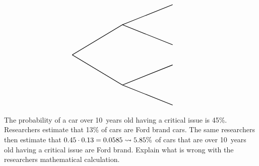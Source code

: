 \documentclass[12pt,letterpaper]{exam}
\begin{document}
\begin{questions}
\[\begin{tikzpicture}[scale= 1.0]
		\node at (1,1) {\FirstUpLabel};	
		\node at (1,-1) {\FirstDownLabel};	
		\node at (1.8,0.6) {\Up};
		\node at (1.8,-0.6) {\Down};
		\draw[thick] (0,0) -- (2.5,1.5);
		\draw[thick] (0,0) -- (2.5,-1.5);
		
		\node at (3.75,2.3) {\SecondUpLabel};
		\node at (3.75,0.7) {\SecondDownLabel};
		\node at (4,1.8) {\UpUp};
		\node at (4.1,1.2) {\UpDown};
		\node at (5.75,2.5) {\first};
		\node at (5.75,0.5) {\second};
		\draw[thick] (2.5,1.5) -- (5,2.5);
		\draw[thick] (2.5,1.5) -- (5,0.5);

		\node at (3.75,-0.7) {\SecondUpLabel};
		\node at (3.75,-2.3) {\SecondDownLabel};
		\node at (4.1,-1.2) {\DownUp};
		\node at (4.1,-1.8) {\DownDown};
		\node at (5.75,-0.5) {\third};	
		\node at (5.75,-2.5) {\fourth};	
		\draw[thick] (2.5,-1.5) -- (5,-0.5);
		\draw[thick] (2.5,-1.5) -- (5,-2.5);
		\end{tikzpicture}
		\]



\newpage
\question[10] The probability of a car over 10~years old having a critical issue is 45\%. Researchers estimate that 13\% of cars are Ford brand cars. The same researchers then estimate that $0.45 \cdot 0.13= 0.0585 \rightsquigarrow 5.85\%$ of cars that are over 10~years old having a critical issue are Ford brand. Explain what is wrong with the researchers mathematical calculation. 


\end{questions}
\end{document}
